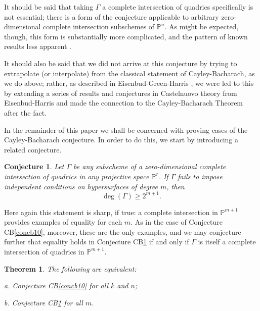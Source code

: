 \documentclass{bull-l}
\newtheorem{thm}[prop]{Theorem}
\theoremstyle{pplain}
\newtheorem{concb}[thmcb]{Conjecture}
\theoremstyle{definition}
\begin{document}
It should be said that taking $\Gamma$ a complete intersection of quadrics
specifically is not essential; there is a form of the conjecture applicable to
arbitrary zero-dimensional complete intersection subschemes of $\mathbb{P}^n$. 
As might be expected, though, this form is substantially more complicated, and
the pattern of known results less apparent \cite{EGH2}.

It should also be said that we did not arrive at this conjecture by trying to
extrapolate (or interpolate) from the classical statement of Cayley-Bacharach,
as we do above; rather, as described in Eisenbud-Green-Harris \cite{EGH1}, we
were led to this by extending a series of results and conjectures in
Castelnuovo  theory from  Eisenbud-Harris \cite{EH1} and made the connection to
the  Cayley-Bacharach Theorem after the fact.

In the remainder of this paper we shall be concerned with proving cases of the 
Cayley-Bacharach conjecture.  In order to do this, we start by introducing a
related conjecture.

\begin{concb} \label{concb11}
Let $\Gamma$ be any subscheme of a zero-dimensional complete intersection of
quadrics in any projective space $\mathbb{P}^r$. If $\Gamma$ fails to impose
independent conditions on hypersurfaces of degree $m$, then
\[\deg(\Gamma)\ge 2^{m+1}.\]
\end{concb}

Here again this statement is sharp, if true: a complete intersection in
$\mathbb{P}^{m+1}$ provides examples of equality for each $m$.  As in the case
of Conjecture CB\ref{concb10}, moreover, these are the only examples, and we
may conjecture further that equality holds in Conjecture CB\ref{concb11} if and
only if $\Gamma$ is itself a complete intersection of quadrics in
$\mathbb{P}^{m+1}$.

\begin{thm} \label{thm:eleven}
The following are equivalent\textup{:}

\textup{a.} Conjecture \textup{CB\ref{concb10}} for all $k$ and $n$\textup{;}

\textup{b.} Conjecture \textup{CB\ref{concb11}} for all $m$.
\end{thm}
\end{document}
